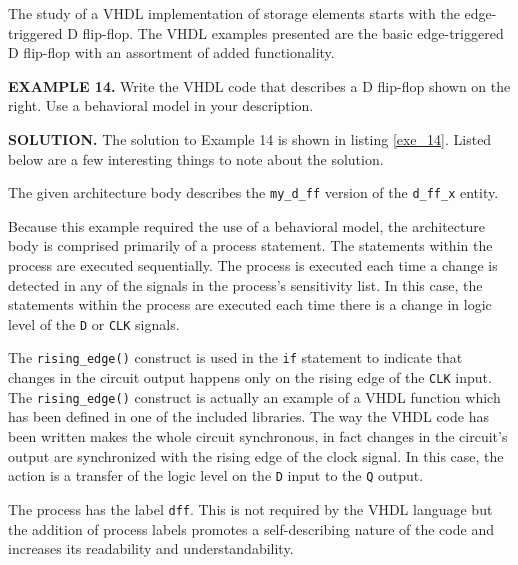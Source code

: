The study of a VHDL implementation of storage elements starts with the edge-triggered D flip-flop. The VHDL examples presented are the basic edge-triggered D flip-flop with an assortment of added functionality. 
\begin{leftbar}
\begin{minipage}{0.5\linewidth}
\noindent
\textbf{EXAMPLE 14.}
Write the VHDL code that describes a D flip-flop shown on the right. Use a behavioral model in your description.
\end{minipage}
\begin{minipage}{0.47\linewidth}
\begin{flushright}
\end{flushright}
\end{minipage}
\end{leftbar}
\noindent
\textbf{SOLUTION.} The solution to Example 14 is shown in listing \ref{exe_14}. Listed below are a few interesting things to note about the solution.
\begin{my_list}
\item The given architecture body describes the \texttt{my\_d\_ff} version of the \texttt{d\_ff\_x} entity.
\item Because this example required the use of a behavioral model, the architecture body is comprised primarily of a process statement. The statements within the process are executed sequentially. The process is executed each time a change is detected in any of the signals in the process's sensitivity list.  In this case, the statements within the process are executed each time there is a change in logic level of the \texttt{D} or \texttt{CLK} signals.
\item The \texttt{rising\_edge()} construct is used in the \texttt{if} statement to indicate that changes in the circuit output happens only on the rising edge of the \texttt{CLK} input. The \texttt{rising\_edge()} construct is actually an example of a VHDL function which has been defined in one of the included libraries. The way the VHDL code has been written makes the whole circuit synchronous, in fact changes in the circuit's output are synchronized with the rising edge of the clock signal. In this case, the action is a transfer of the logic level on the \texttt{D} input to the \texttt{Q} output. 
\item The process has the label \texttt{dff}. This is not required by the VHDL language but the addition of process labels promotes a self-describing nature of the code and increases its readability and understandability. 
\end{my_list}
